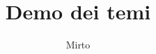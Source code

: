 \documentclass{beamer}
\title{Demo dei temi}
\author{Mirto}
\begin{document}
\begin{frame}
\titlepage
\end{frame}
\end{document}
